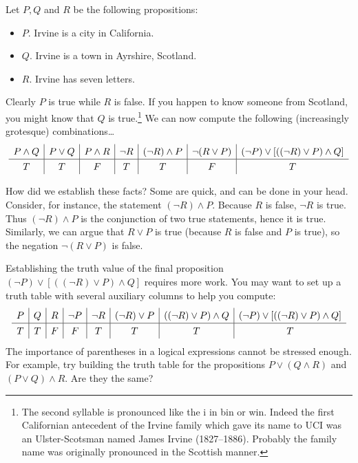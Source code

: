 \begin{example}{}{}
Let $P,Q$ and $R$ be the following propositions:
\begin{itemize}
\item[]$P$. Irvine is a city in California.
\item[]$Q$. Irvine is a town in Ayrshire, Scotland.
\item[]$R$. Irvine has seven letters.
\end{itemize}
Clearly $P$ is true while $R$ is false. If you happen to know someone from Scotland, you might know that $Q$ is true.\footnote{The second syllable is pronounced like the i in bin or win. Indeed the first Californian antecedent of the Irvine family which gave its name to UCI was an Ulster-Scotsman named James Irvine (1827--1886). Probably the family name was originally pronounced in the Scottish manner.} We can now compute the following (increasingly grotesque) combinations\ldots
\[\def\arraystretch{1.3}
\begin{array}{c|c|c|c|c|c|c}
P\wedge Q&P\vee Q&P\wedge R&\neg R&(\neg R)\wedge P&\neg(R\vee P)&(\neg P)\vee [((\neg R)\vee P)\wedge Q] \\\hline
T & T & F & T & T & F & T
\end{array}\]
\end{example}

 How did we establish these facts? Some  are quick,  and can be done in your head. Consider, for instance, the statement  $(\neg R)\wedge P$. Because $R$ is false, $\neg R$ is true. Thus $(\neg R)\wedge P$ is the conjunction of two true statements, hence it is true. Similarly, we can argue that $R\vee P$ is true (because $R$ is false and $P$ is true), so the negation $\neg(R\vee P)$ is false.

  Establishing the truth value of the final proposition $(\neg P)\vee [((\neg R)\vee P) \wedge Q]$ requires more work. You may want to set up a truth table with several auxiliary columns to help you compute: 
\[\def\arraystretch{1.3}
\begin{array}{c|c|c|c|c|c|c|c}
P & Q & R & \neg P & \neg R & (\neg R) \vee P & ((\neg R)\vee P) \wedge Q &  (\neg P) \vee [ ((\neg R)\vee P) \wedge Q] \\\hline
 T & T & F & F            & T         & T                        & T                                               & T
 \end{array}\]
The importance of parentheses in a logical expressions cannot be stressed enough. For example, try building the truth table for the propositions $P\vee(Q\wedge R)$ and $(P\vee Q)\wedge R$. Are they the same?\pagebreak[4]






